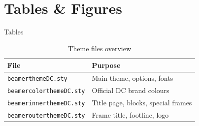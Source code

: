 \documentclass[aspectratio=169,10pt]{beamer}
\begin{document}
\section{Tables \& Figures}

\begin{frame}{Tables}
  \begin{table}
    \centering
    \caption{Theme files overview}
    \begin{tabular}{ll}
      \hline
      \textbf{File} & \textbf{Purpose} \\
      \hline
      \texttt{beamerthemeDC.sty}      & Main theme, options, fonts \\
      \texttt{beamercolorthemeDC.sty}  & Official DC brand colours \\
      \texttt{beamerinnerthemeDC.sty}  & Title page, blocks, special frames \\
      \texttt{beamerouterthemeDC.sty}  & Frame title, footline, logo \\
      \hline
    \end{tabular}
  \end{table}
\end{frame}
\end{document}
